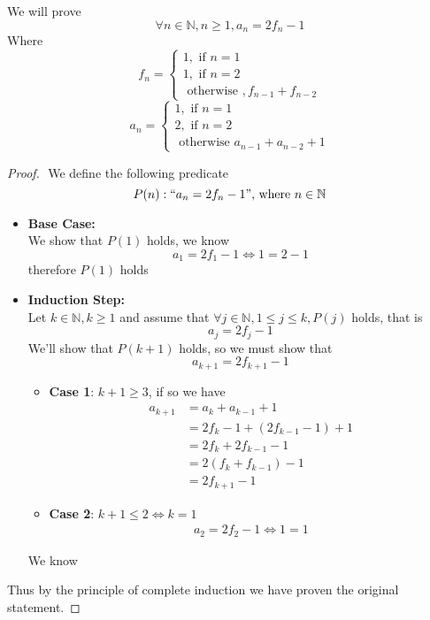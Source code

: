 \documentclass[11pt]{book}
\begin{document}
We will prove 
\[
\forall n \in \mathbb{N} , n\ge 1, a_{n} = 2f_{n}  - 1
\]
Where 
\[
    f_{n}  = 
    \begin{cases}
        1, \text{ if } n= 1\\
        1, \text{ if } n= 2\\
        \text{ otherwise  }, f_{n - 1}  + f_{n  - 2} 
    \end{cases}
\]
\[
a_{n} = 
\begin{cases}
    1, \text{ if } n = 1\\
    2, \text{ if } n= 2 \\
    \text{ otherwise  } a_{n  - 1}  + a_{n - 2}  + 1

\end{cases}
\]

\begin{proof}
    $ $\newline
    We define the following predicate
    \[
    P(n): `` a_{n} = 2f_{n}  - 1 "\text{, where } n \in \mathbb{N} 
    \]
    \begin{itemize}
        \item \textbf{Base Case:}\\
            We show that $P(1)$ holds, we know 
            \[
                a_{1} = 2f_{1} -1 \Leftrightarrow 1= 2 - 1
            \]
            therefore $P\left(1\right) $ holds 
        \item \textbf{Induction Step:}\\
            Let $k \in \mathbb{N}, k \ge 1$ and assume that $\forall j \in \mathbb{N} , 1 \le  j \le k, P\left(j\right)$ holds, that is 
            \[
                a_{j} = 2f_{j}  - 1
            \]
            We'll show that $P(k + 1)$ holds, so we must show that 
            \[
            a_{k + 1} = 2f_{k + 1}  - 1
            \]
            \begin{itemize}
                \item \textbf{Case 1}: $k + 1 \ge 3$,  if so we have
                    \begin{align*}
                        a_{k + 1} &= a_{k}  + a_{k - 1}  + 1  \tag{$\alpha$ }\\ 
                        &= 2f_{k}  - 1 + \left( 2f_{k - 1}  - 1 \right)  + 1\\
                        &= 2f_{k}  + 2f_{k - 1}  - 1  \\ 
                        &= 2\left( f_{k}  + f_{k - 1}  \right)  - 1 \\
                        &= 2f_{k + 1} -1 
                    \end{align*}
                \item \textbf{Case 2}: $k + 1 \le 2 \Leftrightarrow k = 1$
                    \begin{align*}
                        a_{2} = 2f_{2}  - 1 \Leftrightarrow 1= 1
                    \end{align*}
            \end{itemize}
            We know 
    \end{itemize}
    Thus by the principle of complete induction we have proven the original statement.
\end{proof}
\end{document}
